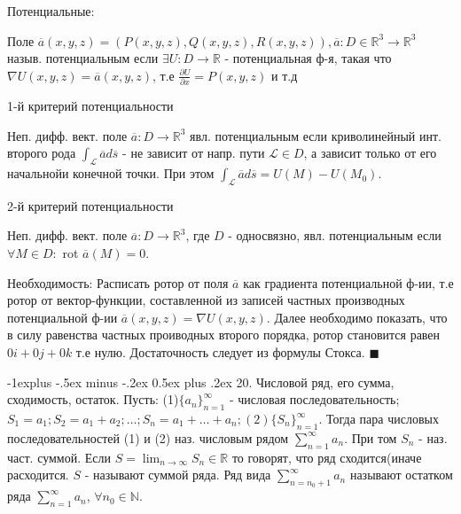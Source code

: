 \documentclass[unicode,10pt, landscape]{article}
\makeatletter
\renewcommand{\subsection}{\@startsection{subsection}{2}{0mm}%
                                {-1explus -.5ex minus -.2ex}%
                                {0.5ex plus .2ex}%
                                {\normalfont\normalsize\bfseries}}
\newenvironment{Proof} %
{\par\noindent{\bf Док-во:}} %
{\hfill$\scriptstyle\blacksquare$}
\makeatother
\begin{document}
\begin{multicols}{4}
Потенциальные:
\begin{Def}
Поле $\overline{a}(x, y, z) = (P(x, y, z), Q(x, y, z), R(x, y, z)), \overline{a} : D \in \mathbb{R}^3 \to \mathbb{R}^3$ назыв. потенциальным если $\exists U: D \to \mathbb{R}$ - потенциальная ф-я, такая что $\nabla U(x, y, z) = \overline{a}(x, y, z)$, т.е $\frac{\partial U}{\partial x} = P(x, y, z)$ и т.д
\end{Def}
1-й критерий потенциальности
\begin{Th}
Неп. дифф. вект. поле $\overline{a}: D \to \mathbb{R}^3$ явл. потенциальным если криволинейный инт. второго рода $\int_{\mathcal{L}}\overline{a}d\overline{s}$ - не зависит от напр. пути $\mathcal{L} \in D$, а зависит только от его начальнойи конечной точки. При этом $\int_{\mathcal{L}}\overline{a}d\overline{s} = U(M) - U(M_0)$.
\end{Th}
2-й критерий потенциальности
\begin{Th}
Неп. дифф. вект. поле $\overline{a}: D \to \mathbb{R}^3$, где $D$ - односвязно, явл. потенциальным если $\forall M \in D: $ rot $\overline{a}(M) = 0$.
\begin{Proof}
Необходимость: Расписать ротор от поля $\overline{a}$ как градиента потенциальной ф-ии, т.е ротор от вектор-функции, составленной из записей частных производных потенциальной ф-ии $\overline{a}(x, y, z) = \nabla U(x, y, z)$. Далее необходимо показать, что в силу равенства частных проиводных второго порядка, ротор становится равен $0i + 0j + 0k$ т.е нулю.
Достаточность следует из формулы Стокса.
\end{Proof}
\end{Th}


\subsection{20. Числовой ряд, его сумма, сходимость, остаток.}
Пусть: (1)$\{a_n\}_{n = 1}^\infty$ - числовая последовательность; $S_1 = a_1; S_2 = a_1+a_2; \ldots; S_n = a_1 + \ldots + a_n; (2) \{S_n\}_{n=1}^\infty$. Тогда пара числовых последовательностей (1) и (2) наз. числовым рядом $\sum_{n=1}^\infty a_n$. При том $S_n$ - наз. част. суммой. Если $S = \lim_{n \to \infty}S_n \in \mathbb{R}$ то говорят, что ряд сходится(иначе расходится. $S$ - называют суммой ряда. Ряд вида $\sum_{n = n_0 + 1}^\infty a_n$ называют остатком ряда $\sum_{n=1}^\infty a_n$, $\forall n_0 \in \mathbb{N}$.



\end{multicols}
\end{document}
